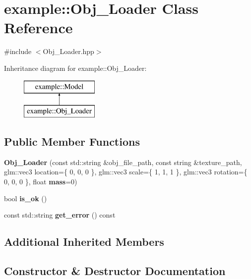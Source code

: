 \section{example\+::Obj\+\_\+\+Loader Class Reference}
\label{classexample_1_1_obj___loader}


{\ttfamily \#include $<$Obj\+\_\+\+Loader.\+hpp$>$}

Inheritance diagram for example\+::Obj\+\_\+\+Loader\+:\begin{figure}[H]
\begin{center}
\leavevmode
\includegraphics[height=2.000000cm]{classexample_1_1_obj___loader}
\end{center}
\end{figure}
\subsection*{Public Member Functions}
\begin{DoxyCompactItemize}
\item 
\textbf{ Obj\+\_\+\+Loader} (const std\+::string \&obj\+\_\+file\+\_\+path, const string \&texture\+\_\+path, glm\+::vec3 location=\{ 0, 0, 0 \}, glm\+::vec3 scale=\{ 1, 1, 1 \}, glm\+::vec3 rotation=\{ 0, 0, 0 \}, float \textbf{ mass}=0)
\item 
bool \textbf{ is\+\_\+ok} ()
\item 
const std\+::string \textbf{ get\+\_\+error} () const
\end{DoxyCompactItemize}
\subsection*{Additional Inherited Members}


\subsection{Constructor \& Destructor Documentation}
\mbox{\label{classexample_1_1_obj___loader_a7bd3caa1fae0704b59b9be2a998dee3a}} 
